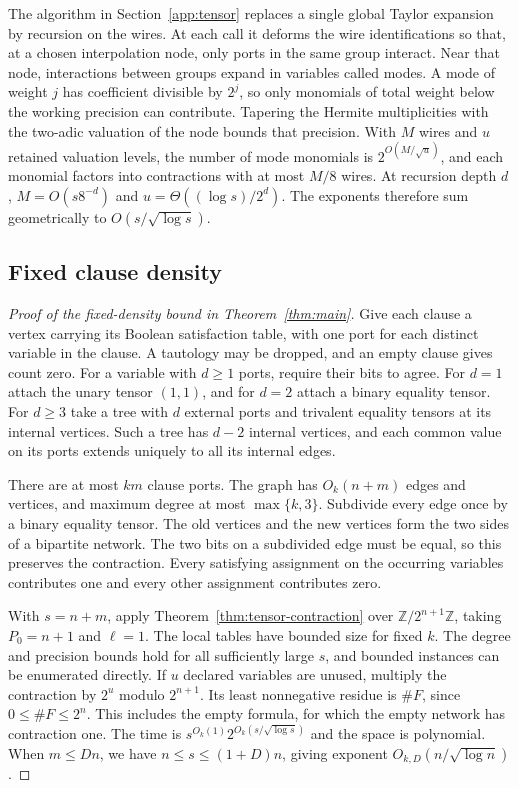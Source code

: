 The algorithm in Section~\ref{app:tensor} replaces a single global
Taylor expansion by recursion on the wires. At each call it deforms
the wire identifications so that, at a chosen interpolation node,
only ports in the same group interact. Near that node, interactions
between groups expand in variables called modes. A mode of weight
$j$ has coefficient divisible by $2^j$, so only monomials of total
weight below the working precision can contribute. Tapering the
Hermite multiplicities with the two-adic valuation of the node
bounds that precision. With $M$ wires and $u$ retained valuation
levels, the number of mode monomials is $2^{O(M/\sqrt{u})}$, and
each monomial factors into contractions with at most $M/8$ wires.
At recursion depth $d$, $M=O(s8^{-d})$ and $u=\Theta((\log s)/2^d)$.
The exponents therefore sum geometrically to $O(s/\sqrt{\log s})$.

\subsection{Fixed clause density}\label{subsec:sharp-fixed-density}

\begin{proof}[Proof of the fixed-density bound in Theorem~\ref{thm:main}]
Give each clause a vertex carrying its Boolean satisfaction table, with
one port for each distinct variable in the clause. A tautology may be
dropped, and an empty clause gives count zero. For a variable with
$d\ge1$ ports, require their bits to agree. For $d=1$ attach the unary
tensor $(1,1)$, and for $d=2$ attach a binary equality tensor. For
$d\ge3$ take a tree with $d$ external ports and trivalent equality
tensors at its internal vertices. Such a tree has $d-2$ internal
vertices, and each common value on its ports extends uniquely to all
its internal edges.

There are at most $km$ clause ports. The graph has $O_k(n+m)$ edges
and vertices, and maximum degree at most $\max\{k,3\}$. Subdivide
every edge once by a binary equality tensor. The old vertices and the
new vertices form the two sides of a bipartite network. The two bits
on a subdivided edge must be equal, so this preserves the contraction.
Every satisfying assignment on the occurring variables contributes
one and every other assignment contributes zero.

With $s=n+m$, apply Theorem~\ref{thm:tensor-contraction} over
$\mathbb Z/2^{n+1}\mathbb Z$, taking $P_0=n+1$ and $\ell=1$. The
local tables have bounded size for fixed $k$. The
degree and precision bounds hold for all sufficiently large $s$, and
bounded instances can be enumerated directly. If $u$ declared
variables are unused, multiply the contraction by $2^u$ modulo
$2^{n+1}$. Its least nonnegative residue is $\#F$, since
$0\le\#F\le2^n$. This includes the empty formula, for which the
empty network has contraction one. The time is
$s^{O_k(1)}2^{O_k(s/\sqrt{\log s})}$ and the space is polynomial.
When $m\le Dn$, we have $n\le s\le(1+D)n$, giving exponent
$O_{k,D}(n/\sqrt{\log n})$.
\end{proof}

